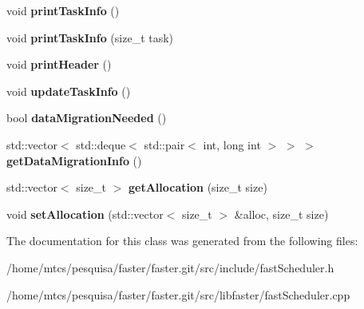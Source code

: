 \begin{DoxyCompactItemize}
\hypertarget{classfaster_1_1fastScheduler_a426b97359b035f696ea99b0ce65ed781}{}\label{classfaster_1_1fastScheduler_a426b97359b035f696ea99b0ce65ed781} 
void {\bfseries print\+Task\+Info} ()
\item 
\hypertarget{classfaster_1_1fastScheduler_a93a5bb37ea8bc6a8d601dd01a2ed736b}{}\label{classfaster_1_1fastScheduler_a93a5bb37ea8bc6a8d601dd01a2ed736b} 
void {\bfseries print\+Task\+Info} (size\+\_\+t task)
\item 
\hypertarget{classfaster_1_1fastScheduler_a6c4b825db8c979eafead42e321e95d05}{}\label{classfaster_1_1fastScheduler_a6c4b825db8c979eafead42e321e95d05} 
void {\bfseries print\+Header} ()
\item 
\hypertarget{classfaster_1_1fastScheduler_a0c91feaec23646ee84e1fa530fe7cccf}{}\label{classfaster_1_1fastScheduler_a0c91feaec23646ee84e1fa530fe7cccf} 
void {\bfseries update\+Task\+Info} ()
\item 
\hypertarget{classfaster_1_1fastScheduler_a650ace70f7cb64835674cd67a5f605ca}{}\label{classfaster_1_1fastScheduler_a650ace70f7cb64835674cd67a5f605ca} 
bool {\bfseries data\+Migration\+Needed} ()
\item 
\hypertarget{classfaster_1_1fastScheduler_a181ea8d42d461ffd16785f77b4d6b416}{}\label{classfaster_1_1fastScheduler_a181ea8d42d461ffd16785f77b4d6b416} 
std\+::vector$<$ std\+::deque$<$ std\+::pair$<$ int, long int $>$ $>$ $>$ {\bfseries get\+Data\+Migration\+Info} ()
\item 
\hypertarget{classfaster_1_1fastScheduler_a47394267a9a85f9747a483a43cf6a650}{}\label{classfaster_1_1fastScheduler_a47394267a9a85f9747a483a43cf6a650} 
std\+::vector$<$ size\+\_\+t $>$ {\bfseries get\+Allocation} (size\+\_\+t size)
\item 
\hypertarget{classfaster_1_1fastScheduler_a6a691cada9432d0054a2dfefbe1fc9a3}{}\label{classfaster_1_1fastScheduler_a6a691cada9432d0054a2dfefbe1fc9a3} 
void {\bfseries set\+Allocation} (std\+::vector$<$ size\+\_\+t $>$ \&alloc, size\+\_\+t size)
\end{DoxyCompactItemize}


The documentation for this class was generated from the following files\+:\begin{DoxyCompactItemize}
\item 
/home/mtcs/pesquisa/faster/faster.\+git/src/include/fast\+Scheduler.\+h\item 
/home/mtcs/pesquisa/faster/faster.\+git/src/libfaster/fast\+Scheduler.\+cpp\end{DoxyCompactItemize}
